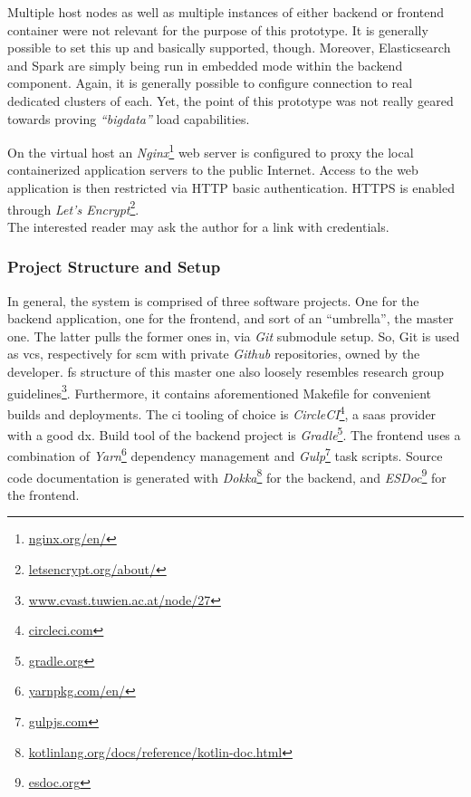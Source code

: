 Multiple host nodes as well as multiple instances of either backend or frontend container were not relevant for the purpose of this prototype.
It is generally possible to set this up and basically supported, though.
Moreover, Elasticsearch and Spark are simply being run in embedded mode within the backend component.
Again, it is generally possible to configure connection to real dedicated clusters of each.
Yet, the point of this prototype was not really geared towards proving \emph{``\gls{bigdata}''} load capabilities.

On the virtual host an \emph{Nginx}\footnote{\textcolor{blue}{\href{https://nginx.org/en/}{nginx.org/en/}}} web server is configured to proxy the local containerized application servers to the public Internet.
Access to the web application is then restricted via \textsc{HTTP} basic authentication.
\textsc{HTTPS} is enabled through \emph{Let's Encrypt}\footnote{\textcolor{blue}{\href{https://letsencrypt.org/about/}{letsencrypt.org/about/}}}. \\
The interested reader may ask the author for a link with credentials.

\subsubsection{Project Structure and Setup}

In general, the system is comprised of three software projects.
One for the backend application, one for the frontend, and sort of an ``umbrella'', the master one.
The latter pulls the former ones in, via \emph{Git} submodule setup.
So, Git is used as \gls{vcs}, respectively for \gls{scm} with private \emph{Github} repositories, owned by the developer.
\gls{fs} structure of this master one also loosely resembles \emph{} research group guidelines\footnote{\textcolor{blue}{\href{http://www.cvast.tuwien.ac.at/node/27}{www.cvast.tuwien.ac.at/node/27}}}.
Furthermore, it contains aforementioned Makefile for convenient builds and deployments.
The \gls{ci} tooling of choice is \emph{CircleCI}\footnote{\textcolor{blue}{\href{https://circleci.com/}{circleci.com}}}, a \gls{saas} provider with a good \gls{dx}.
Build tool of the backend project is \emph{Gradle}\footnote{\textcolor{blue}{\href{https://gradle.org/}{gradle.org}}}.
The frontend uses a combination of \emph{Yarn}\footnote{\textcolor{blue}{\href{https://yarnpkg.com/en/}{yarnpkg.com/en/}}} dependency management and \emph{Gulp}\footnote{\textcolor{blue}{\href{http://gulpjs.com/}{gulpjs.com}}} task scripts. Source code documentation is generated with \emph{Dokka}\footnote{\textcolor{blue}{\href{https://kotlinlang.org/docs/reference/kotlin-doc.html}{kotlinlang.org/docs/reference/kotlin-doc.html}}} for the backend, and \emph{ESDoc}\footnote{\textcolor{blue}{\href{https://esdoc.org/}{esdoc.org}}} for the frontend.


